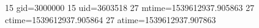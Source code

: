 15 gid=3000000
15 uid=3603518
27 mtime=1539612937.905863
27 ctime=1539612937.905864
27 atime=1539612937.907863
